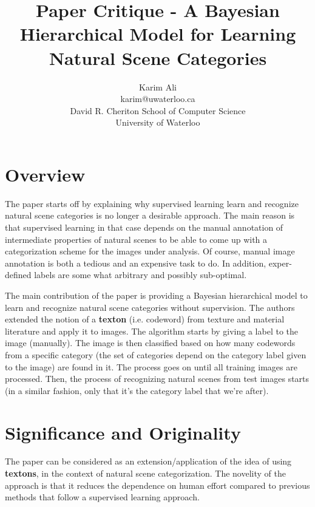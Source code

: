 \documentclass[11pt,a4paper]{article}
\begin{document}
\title{Paper Critique - A Bayesian Hierarchical Model for Learning Natural Scene Categories}


\author{Karim Ali\\
karim@uwaterloo.ca\\
David R. Cheriton School of Computer Science\\
University of Waterloo\\
}

\date{}

\maketitle

\section{Overview}
The paper starts off by explaining why supervised learning learn and recognize natural scene categories is no longer a desirable approach. The main reason is
that supervised learning in that case depends on the manual annotation of intermediate properties of natural scenes to be able to come up with a categorization
scheme for the images under analysis. Of course, manual image annotation is both a tedious and an expensive task to do. In addition, exper-defined labels are
some what arbitrary and possibly sub-optimal.

The main contribution of the paper is providing a Bayesian hierarchical model to learn and recognize natural scene categories without supervision. The authors
extended the notion of a \textbf{texton} (i.e. codeword) from texture and material literature and apply it to images. The algorithm starts by giving a label
to the image (manually). The image is then classified based on how many codewords from a specific category (the set of categories depend on the category
label given to the image) are found in it. The process goes on until all training images are processed. Then, the process of recognizing natural scenes from
test images starts (in a similar fashion, only that it's the category label that we're after).

\section{Significance and Originality}
The paper can be considered as an extension/application of the idea of using \textbf{textons}, in the context of natural scene categorization. The novelity of
the approach is that it reduces the dependence on human effort compared to previous methods that follow a supervised learning approach.
\end{document}
